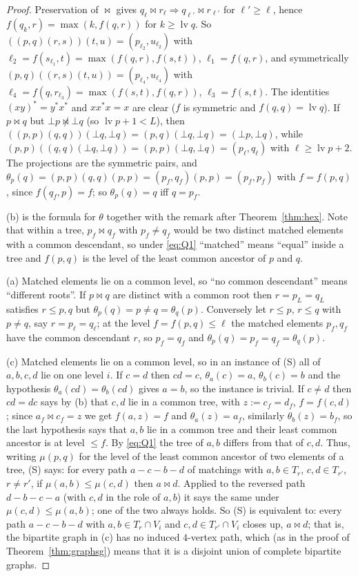 \documentclass[11pt]{amsart}
\theoremstyle{definition}
\newcommand{\mt}{\bowtie}   %
\begin{document}
\begin{proof}
Preservation of $\mt$ gives $q_\ell\mt r_\ell\Rightarrow q_{\ell'}\mt r_{\ell'}$ for $\ell'\ge\ell$, hence $f(q_k,r)=\max(k,f(q,r))$ for $k\ge\operatorname{lv}q$. So $((p,q)(r,s))(t,u)=(p_{\ell_2},u_{\ell_2})$ with $\ell_2=f(s_{\ell_1},t)=\max(f(q,r),f(s,t))$, $\ell_1=f(q,r)$, and symmetrically $(p,q)((r,s)(t,u))=(p_{\ell_4},u_{\ell_4})$ with $\ell_4=f(q,r_{\ell_3})=\max(f(s,t),f(q,r))$, $\ell_3=f(s,t)$. The identities $(xy)^*=y^*x^*$ and $xx^*x=x$ are clear ($f$ is symmetric and $f(q,q)=\operatorname{lv}q$). If $p\mt q$ but $\bot p\not\mt\bot q$ (so $\operatorname{lv}p+1<L$), then $((p,p)(q,q))(\bot q,\bot q)=(p,q)(\bot q,\bot q)=(\bot p,\bot q)$, while $(p,p)((q,q)(\bot q,\bot q))=(p,p)(\bot q,\bot q)=(p_\ell,q_\ell)$ with $\ell\ge\operatorname{lv}p+2$. The projections are the symmetric pairs, and $\theta_p(q)=(p,p)(q,q)(p,p)=(p_f,q_f)(p,p)=(p_f,p_f)$ with $f=f(p,q)$, since $f(q_f,p)=f$; so $\theta_p(q)=q$ iff $q=p_f$.

(b) is the formula for $\theta$ together with the remark after Theorem~\ref{thm:hex}. Note that within a tree, $p_f\mt q_f$ with $p_f\ne q_f$ would be two distinct matched elements with a common descendant, so under \eqref{eq:Q1} ``matched'' means ``equal'' inside a tree and $f(p,q)$ is the level of the least common ancestor of $p$ and $q$.

(a) Matched elements lie on a common level, so ``no common descendant'' means ``different roots''. If $p\mt q$ are distinct with a common root then $r=p_L=q_L$ satisfies $r\le p,q$ but $\theta_p(q)=p\ne q=\theta_q(p)$. Conversely let $r\le p$, $r\le q$ with $p\ne q$, say $r=p_\ell=q_\ell$; at the level $f=f(p,q)\le\ell$ the matched elements $p_f,q_f$ have the common descendant $r$, so $p_f=q_f$ and $\theta_p(q)=p_f=q_f=\theta_q(p)$.

(c) Matched elements lie on a common level, so in an instance of (S) all of $a,b,c,d$ lie on one level $i$. If $c=d$ then $cd=c$, $\theta_a(c)=a$, $\theta_b(c)=b$ and the hypothesis $\theta_a(cd)=\theta_b(cd)$ gives $a=b$, so the instance is trivial. If $c\ne d$ then $cd=dc$ says by (b) that $c,d$ lie in a common tree, with $z:=c_f=d_f$, $f=f(c,d)$; since $a_f\mt c_f=z$ we get $f(a,z)=f$ and $\theta_a(z)=a_f$, similarly $\theta_b(z)=b_f$, so the last hypothesis says that $a,b$ lie in a common tree and their least common ancestor is at level $\le f$. By \eqref{eq:Q1} the tree of $a,b$ differs from that of $c,d$. Thus, writing $\mu(p,q)$ for the level of the least common ancestor of two elements of a tree, (S) says: for every path $a-c-b-d$ of matchings with $a,b\in T_r$, $c,d\in T_{r'}$, $r\ne r'$, if $\mu(a,b)\le\mu(c,d)$ then $a\mt d$. Applied to the reversed path $d-b-c-a$ (with $c,d$ in the role of $a,b$) it says the same under $\mu(c,d)\le\mu(a,b)$; one of the two always holds. So (S) is equivalent to: every path $a-c-b-d$ with $a,b\in T_r\cap V_i$ and $c,d\in T_{r'}\cap V_i$ closes up, $a\mt d$; that is, the bipartite graph in (c) has no induced $4$-vertex path, which (as in the proof of Theorem~\ref{thm:graphsg}) means that it is a disjoint union of complete bipartite graphs.


\end{proof}
\end{document}
